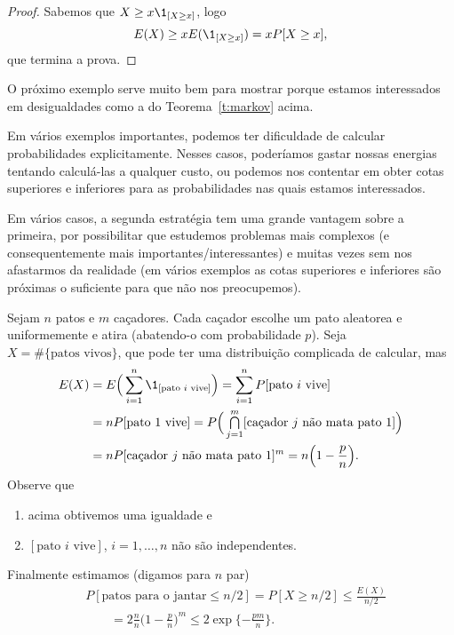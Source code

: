 \begin{proof}
  Sabemos que $X \geq x \1_{[X \geq x]}$, logo
  \begin{equation}
    E(X) \geq x E(\1_{[X \geq x]}) = x P[X \geq x],
  \end{equation}
  que termina a prova.
\end{proof}

O próximo exemplo serve muito bem para mostrar porque estamos interessados em desigualdades como a do Teorema~\ref{t:markov} acima.

Em vários exemplos importantes, podemos ter dificuldade de calcular probabilidades explicitamente.
Nesses casos, poderíamos gastar nossas energias tentando calculá-las a qualquer custo, ou podemos nos contentar em obter cotas superiores e inferiores para as probabilidades nas quais estamos interessados.

Em vários casos, a segunda estratégia tem uma grande vantagem sobre a primeira, por possibilitar que estudemos problemas mais complexos (e consequentemente mais importantes/interessantes) e muitas vezes sem nos afastarmos da realidade (em vários exemplos as cotas superiores e inferiores são próximas o suficiente para que não nos preocupemos).

\begin{example}
  Sejam $n$ patos e $m$ caçadores.
  Cada caçador escolhe um pato aleatorea e uniformemente e atira (abatendo-o com probabilidade $p$).
  Seja $X = \# \{\text{patos vivos}\}$, que pode ter uma distribuição complicada de calcular, mas
  \begin{equation}
    \begin{split}
      E(X) &= E \Big( \sum_{i=1}^n \1_{[\text{pato $i$ vive}]} \Big) = \sum_{i=1}^n P[\text{pato $i$ vive}]\\
      &= n P[\text{pato $1$ vive}] = P\Big( \mcap_{j=1}^m [\text{caçador $j$ não mata pato $1$}] \Big)\\
      &= n P[\text{caçador $j$ não mata pato $1$}]^m = n \Big(1 - \frac{p}{n}\Big).
    \end{split}
  \end{equation}
  Observe que
  \begin{enumerate}[\quad a)]
  \item acima obtivemos uma igualdade e
  \item $[\text{pato $i$ vive}]$, $i = 1, \dots, n$ não são independentes.
  \end{enumerate}

  Finalmente estimamos (digamos para $n$ par)
  \begin{equation}
    \begin{split}
      & P[\text{patos para o jantar} \leq n/2] = P[X \geq n/2] \leq \frac{E(X)}{n/2}\\
      & \qquad = 2 \frac{n}{n} \Big( 1 - \frac{p}{n}\Big)^m \leq 2 \exp \{- \frac{pm}{n}\}.
    \end{split}
  \end{equation}
\end{example}

